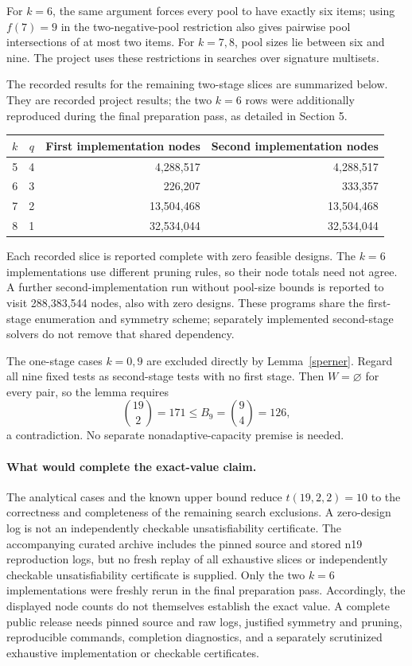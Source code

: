 \documentclass[11pt]{article}
\begin{document}
For $k=6$, the same argument forces every pool to have exactly six items; using $f(7)=9$ in the two-negative-pool restriction also gives pairwise pool intersections of at most two items. For $k=7,8$, pool sizes lie between six and nine. The project uses these restrictions in searches over signature multisets.

The recorded results for the remaining two-stage slices are summarized below. They are recorded project results; the two $k=6$ rows were additionally reproduced during the final preparation pass, as detailed in Section 5.
\begin{center}\small
\begin{tabular}{ccrr}
\toprule
$k$&$q$&First implementation nodes&Second implementation nodes\\
\midrule
5&4&4,288,517&4,288,517\\
6&3&226,207&333,357\\
7&2&13,504,468&13,504,468\\
8&1&32,534,044&32,534,044\\
\bottomrule
\end{tabular}\end{center}
Each recorded slice is reported complete with zero feasible designs. The $k=6$ implementations use different pruning rules, so their node totals need not agree. A further second-implementation run without pool-size bounds is reported to visit 288,383,544 nodes, also with zero designs. These programs share the first-stage enumeration and symmetry scheme; separately implemented second-stage solvers do not remove that shared dependency.

The one-stage cases $k=0,9$ are excluded directly by Lemma~\ref{sperner}. Regard all nine fixed tests as second-stage tests with no first stage. Then $W=\varnothing$ for every pair, so the lemma requires
\[
\binom{19}2=171\le B_9=\binom94=126,
\]
a contradiction. No separate nonadaptive-capacity premise is needed.

\paragraph{What would complete the exact-value claim.}
The analytical cases and the known upper bound reduce $t(19,2,2)=10$ to the correctness and completeness of the remaining search exclusions. A zero-design log is not an independently checkable unsatisfiability certificate. The accompanying curated archive includes the pinned source and stored n19 reproduction logs, but no fresh replay of all exhaustive slices or independently checkable unsatisfiability certificate is supplied. Only the two $k=6$ implementations were freshly rerun in the final preparation pass. Accordingly, the displayed node counts do not themselves establish the exact value. A complete public release needs pinned source and raw logs, justified symmetry and pruning, reproducible commands, completion diagnostics, and a separately scrutinized exhaustive implementation or checkable certificates.
\end{document}
